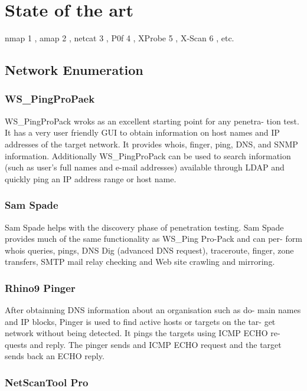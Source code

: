 \chapter{State of the art}


nmap 1 , amap 2 , netcat 3 , P0f 4 , XProbe 5 , X-Scan 6 , etc.


\section{Network Enumeration}

\subsection{WS_PingProPaek}

WS_PingProPack wroks as an excellent starting point for any penetra-
tion test. It has a very user friendly GUI to obtain information on host names and IP
addresses of the target network. It provides whois, finger, ping, DNS, and SNMP
information. Additionally WS_PingProPack can be used to search information
(such as user's full names and e-mail addresses) available through LDAP and
quickly ping an IP address range or host name.


\subsection{Sam Spade}

Sam Spade helps with the discovery phase of penetration testing. Sam
Spade provides much of the same functionality as WS_Ping Pro-Pack and can per-
form whois queries, pings, DNS Dig (advanced DNS request), traceroute, finger,
zone transfers, SMTP mail relay checking and Web site crawling and mirroring.

\subsection{Rhino9 Pinger}

After obtainning DNS information about an organisation such as do-
main names and IP blocks, Pinger is used to find active hosts or targets on the tar-
get network without being detected. It pings the targets using ICMP ECHO re-
quests and reply. The pinger sends and ICMP ECHO request and the target sends
back an ECHO reply.

\subsection{NetScanTool Pro}


